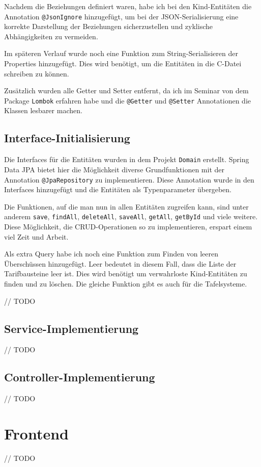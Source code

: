 Nachdem die Beziehungen definiert waren, habe ich bei den Kind-Entitäten die Annotation \texttt{@JsonIgnore} hinzugefügt, 
um bei der JSON-Serialisierung eine korrekte Darstellung der Beziehungen sicherzustellen und zyklische Abhängigkeiten zu vermeiden.

Im späteren Verlauf wurde noch eine Funktion zum String-Serialisieren der Properties hinzugefügt. Dies wird benötigt, um die Entitäten in die C-Datei schreiben zu können.

Zusätzlich wurden alle Getter und Setter entfernt, da ich im Seminar von dem Package \texttt{Lombok} erfahren habe und 
die \texttt{@Getter} und \texttt{@Setter} Annotationen die Klassen lesbarer machen.

\subsection{Interface-Initialisierung}
Die Interfaces für die Entitäten wurden in dem Projekt \texttt{Domain} erstellt. Spring Data JPA bietet hier die Möglichkeit diverse Grundfunktionen mit der Annotation 
\texttt{@JpaRepository} zu implementieren. Diese Annotation wurde in den Interfaces hinzugefügt und die Entitäten als Typenparameter übergeben.

Die Funktionen, auf die man nun in allen Entitäten zugreifen kann, sind unter anderem \texttt{save}, \texttt{findAll}, \texttt{deleteAll}, \texttt{saveAll}, \texttt{getAll}, \texttt{getById} und viele weitere.
Diese Möglichkeit, die CRUD-Operationen so zu implementieren, erspart einem viel Zeit und Arbeit.

Als extra Query habe ich noch eine Funktion zum Finden von leeren Überschüssen hinzugefügt. Leer bedeutet in diesem Fall, dass die Liste der Tarifbausteine leer ist.
Dies wird benötigt um verwahrloste Kind-Entitäten zu finden und zu löschen. Die gleiche Funktion gibt es auch für die Tafelsysteme.


// TODO
\subsection{Service-Implementierung}
// TODO
\subsection{Controller-Implementierung}
// TODO
\section{Frontend}
// TODO
